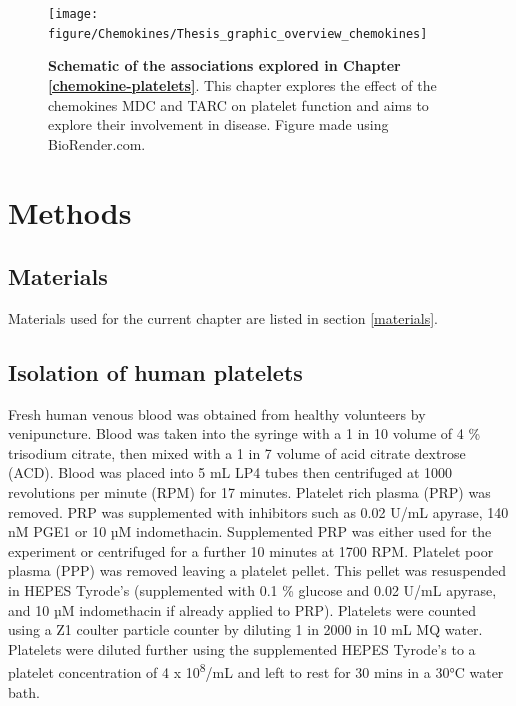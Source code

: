 \documentclass[11pt,twoside]{bristolthesis}
\begin{document}
\begin{figure}

{\centering \texttt{[image: figure/Chemokines/Thesis\_graphic\_overview\_chemokines]} 

}

\caption[Schematic of the associations explored in Chapter \ref{chemokine-platelets}]{\textbf{Schematic of the associations explored in Chapter \ref{chemokine-platelets}}. This chapter explores the effect of the chemokines MDC and TARC on platelet function and aims to explore their involvement in disease. Figure made using BioRender.com.}\label{fig:chemokine-platelet-graphic}
\end{figure}
\hypertarget{methods-1}{%
\section{Methods}\label{methods-1}}

\hypertarget{materials-1}{%
\subsection{Materials}\label{materials-1}}

Materials used for the current chapter are listed in section \ref{materials}.

\hypertarget{isolation-of-human-platelets}{%
\subsection{Isolation of human platelets}\label{isolation-of-human-platelets}}

Fresh human venous blood was obtained from healthy volunteers by venipuncture. Blood was taken into the syringe with a 1 in 10 volume of 4 \% trisodium citrate, then mixed with a 1 in 7 volume of acid citrate dextrose (ACD). Blood was placed into 5 mL LP4 tubes then centrifuged at 1000 revolutions per minute (RPM) for 17 minutes. Platelet rich plasma (PRP) was removed. PRP was supplemented with inhibitors such as 0.02 U/mL apyrase, 140 nM PGE1 or 10 µM indomethacin. Supplemented PRP was either used for the experiment or centrifuged for a further 10 minutes at 1700 RPM. Platelet poor plasma (PPP) was removed leaving a platelet pellet. This pellet was resuspended in HEPES Tyrode's (supplemented with 0.1 \% glucose and 0.02 U/mL apyrase, and 10 µM indomethacin if already applied to PRP). Platelets were counted using a Z1 coulter particle counter by diluting 1 in 2000 in 10 mL MQ water. Platelets were diluted further using the supplemented HEPES Tyrode's to a platelet concentration of 4 x 10\textsuperscript{8}/mL and left to rest for 30 mins in a 30°C water bath.
\end{document}
